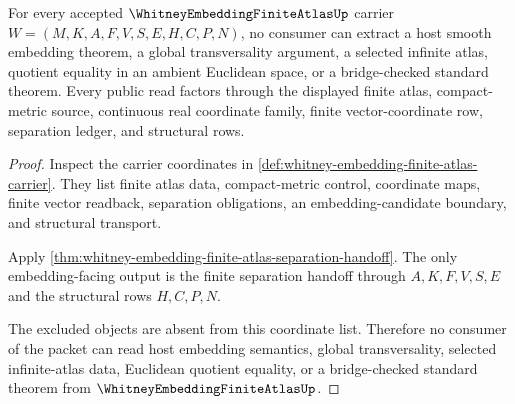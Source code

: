 \begin{theorem}
\label{thm:whitney-embedding-finite-atlas-nonescape}
For every accepted $\WhitneyEmbeddingFiniteAtlasUp$ carrier $W=(M,K,A,F,V,S,E,H,C,P,N)$, no consumer can extract a host smooth embedding theorem, a global transversality argument, a selected infinite atlas, quotient equality in an ambient Euclidean space, or a bridge-checked standard theorem. Every public read factors through the displayed finite atlas, compact-metric source, continuous real coordinate family, finite vector-coordinate row, separation ledger, and structural rows.
\end{theorem}
\begin{proof}
Inspect the carrier coordinates in \autoref{def:whitney-embedding-finite-atlas-carrier}. They list finite atlas data, compact-metric control, coordinate maps, finite vector readback, separation obligations, an embedding-candidate boundary, and structural transport.

Apply \autoref{thm:whitney-embedding-finite-atlas-separation-handoff}. The only embedding-facing output is the finite separation handoff through $A,K,F,V,S,E$ and the structural rows $H,C,P,N$.

The excluded objects are absent from this coordinate list. Therefore no consumer of the packet can read host embedding semantics, global transversality, selected infinite-atlas data, Euclidean quotient equality, or a bridge-checked standard theorem from $\WhitneyEmbeddingFiniteAtlasUp$.
\end{proof}


\begin{closurestatus}{\WhitneyEmbeddingFiniteAtlasUp}
  \theoryclosure{\seedClosure}
  \formalstatus{\formalTargetV}
\end{closurestatus}
